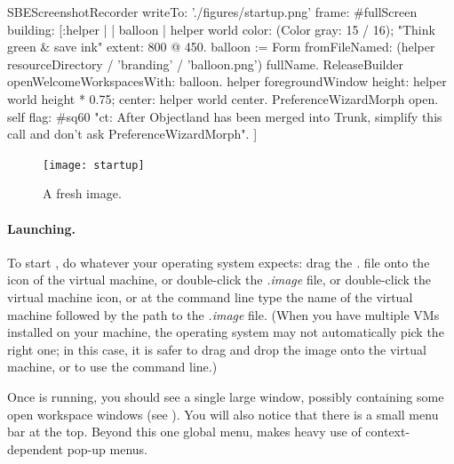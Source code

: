 \documentclass[a4paper,10pt,twoside]{book}
\begin{document}

\begin{ExecuteSmalltalkScript}
SBEScreenshotRecorder writeTo: './figures/startup.png' frame: #fullScreen building: [:helper |
	| balloon |
	helper world
		color: (Color gray: 15 / 16); "Think green & save ink"
		extent: 800 @ 450.
	balloon := Form fromFileNamed: (helper resourceDirectory
		/ 'branding' / 'balloon.png') fullName.
	ReleaseBuilder openWelcomeWorkspacesWith: balloon.
	helper foregroundWindow
		height: helper world height * 0.75;
		center: helper world center.
	PreferenceWizardMorph open.
	self flag: #sq60 "ct: After Objectland has been merged into Trunk, simplify this call and don't ask PreferenceWizardMorph".
]
\end{ExecuteSmalltalkScript}
\begin{figure}[htb]
\centerline {\texttt{[image: startup]}}
\caption{A fresh \sq image.\label{fig:startup}}
\end{figure}

\paragraph{Launching.} To start \sq, do whatever your operating system expects: drag the \emph{.} file onto the icon of the virtual machine, or double-click the \emph{.image} file, or double-click the virtual machine icon, or at the command line type the name of the virtual machine followed by the path to the \emph{.image} file.
(When you have multiple VMs installed on your machine, the operating system may not automatically pick the right one; in this case, it is safer to drag and drop the image onto the virtual machine, or to use the command line.)

Once \sq is running, you should see a single large window, possibly containing some open workspace windows (see ).
You will also notice that there is a small menu bar at the top.
Beyond this one global menu, \sq makes heavy use of context-dependent pop-up menus.

\end{document}
